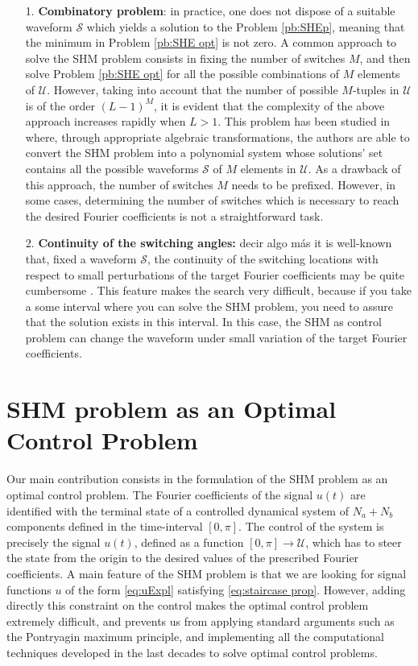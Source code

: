\documentclass[twocolumn]{autart}    %
\begin{document}
\begin{itemize}
	\item[1.]\textbf{Combinatory problem}: in practice, one does not dispose of a suitable waveform $\mathcal{S}$ which yields a solution to the Problem \ref{pb:SHEp}, meaning that the minimum in Problem \ref{pb:SHE opt} is not zero. A common approach to solve the SHM problem consists in fixing the number of switches $M$, and then solve Problem \ref{pb:SHE opt} for  all the possible combinations of $M$ elements of $\mathcal{U}$. However, taking into account that the number of possible $M$-tuples  in $\mathcal U$ is of the order $(L-1)^M$, it is evident that the complexity of the above approach increases rapidly when $L>1$. This problem has been studied in \cite{Yang2015} where, through appropriate algebraic transformations, the authors are able to convert the SHM problem into a polynomial system whose solutions' set contains all the possible waveforms $\mathcal S$ of $M$ elements in $\mathcal{U}$. As a drawback of this approach, the number of switches $M$ needs to be prefixed. However, in some cases,  determining the number of switches which is necessary to reach the desired Fourier coefficients is not a straightforward task.

	\item[2.] \textbf{Continuity of the switching angles:} {\color{red} decir algo más} it is well-known that, fixed a waveform $\mathcal S$, the continuity of the switching locations with respect to small perturbations of the target Fourier coefficients may be quite cumbersome \cite{Yang2017}. This feature makes the  search very difficult, because if you take a some interval where you can solve the SHM problem, you need to assure that the solution exists in this interval. In this case, the SHM as control problem can change the waveform under small variation of the target Fourier coefficients.
\end{itemize}


\section{SHM problem as an Optimal Control Problem}\label{sec:Contributions}

Our main contribution consists in the formulation of the SHM problem as an optimal control problem. The Fourier coefficients of the signal $u(t)$ are identified with the terminal state of a controlled dynamical system of $N_a+N_b$ components defined in the time-interval $[0,\pi]$.  The control of the system is precisely the signal $u(t)$, defined as a function $[0,\pi]\to \mathcal{U}$, which has to steer the state from the origin to the desired values of the prescribed Fourier coefficients. A main feature of the SHM problem is that we are looking for signal functions $u$ of the form \eqref{eq:uExpl} satisfying \eqref{eq:staircase prop}. However, adding directly this constraint on the control makes the optimal control problem extremely difficult, and prevents us from applying standard arguments such as the Pontryagin maximum principle, and implementing all the computational techniques developed in the last decades to solve optimal control problems.
\end{document}
